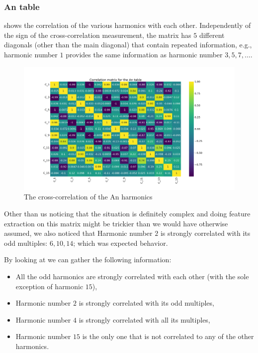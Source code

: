 \subsubsection{An table}
 shows the correlation of the various harmonics with each other. Independently
of the sign of the cross-correlation measurement, the matrix has $5$ different diagonals (other than
the main diagonal) that contain repeated information, e.g., harmonic number $1$ provides the same
information as harmonic number $3, 5, 7, \ldots$.
\begin{figure}
	\centering
	\includegraphics[scale=.25]{img/An_corr_matrix.png}
	\caption{The cross-correlation of the An harmonics} \label{fig:an-corr}
\end{figure}
Other than us noticing that the situation is definitely complex and doing feature extraction on this
matrix might be trickier than we would have otherwise assumed, we also noticed that Harmonic number
$2$ is strongly correlated with its odd multiples: $6, 10, 14$; which was expected behavior.

By looking at  we can gather the following information:
\begin{itemize}
	\item All the odd harmonics are strongly correlated with each other (with the sole exception
	      of harmonic $15$),
	\item Harmonic number $2$ is strongly correlated with its odd multiples,
	\item Harmonic number $4$ is strongly correlated with all its multiples,
	\item Harmonic number $15$ is the only one that is not correlated to any of the other
	      harmonics.
\end{itemize}

